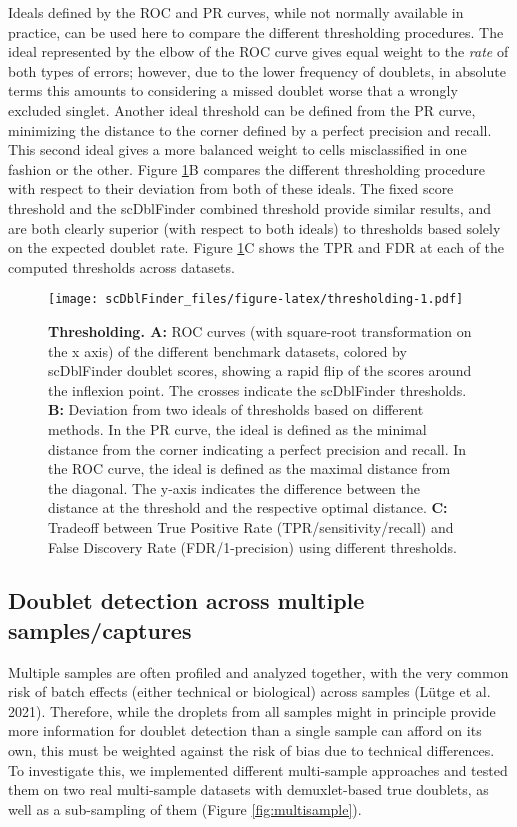 \documentclass[10pt,a4paper,twocolumn]{article}
\begin{document}
Ideals defined by the ROC and PR curves, while not normally available in practice, can be used here to compare the different thresholding procedures.
The ideal represented by the elbow of the ROC curve gives equal weight to the \emph{rate} of both types of errors; however, due to the lower frequency of doublets, in absolute terms this amounts to considering a missed doublet worse that a wrongly excluded singlet.
Another ideal threshold can be defined from the PR curve, minimizing the distance to the corner defined by a perfect precision and recall.
This second ideal gives a more balanced weight to cells misclassified in one fashion or the other.
Figure \ref{fig:thresholding}B compares the different thresholding procedure with respect to their deviation from both of these ideals.
The fixed score threshold and the scDblFinder combined threshold provide similar results, and are both clearly superior (with respect to both ideals) to thresholds based solely on the expected doublet rate.
Figure \ref{fig:thresholding}C shows the TPR and FDR at each of the computed thresholds across datasets.

\begin{figure}
\centering
\texttt{[image: scDblFinder\_files/figure-latex/thresholding-1.pdf]}
\caption{\label{fig:thresholding}\textbf{Thresholding. A:} ROC curves (with square-root transformation on the x axis) of the different benchmark datasets, colored by scDblFinder doublet scores, showing a rapid flip of the scores around the inflexion point. The crosses indicate the scDblFinder thresholds. \textbf{B:} Deviation from two ideals of thresholds based on different methods. In the PR curve, the ideal is defined as the minimal distance from the corner indicating a perfect precision and recall. In the ROC curve, the ideal is defined as the maximal distance from the diagonal. The y-axis indicates the difference between the distance at the threshold and the respective optimal distance. \textbf{C:} Tradeoff between True Positive Rate (TPR/sensitivity/recall) and False Discovery Rate (FDR/1-precision) using different thresholds.}
\end{figure}

\subsection{Doublet detection across multiple samples/captures}

Multiple samples are often profiled and analyzed together, with the very common risk of batch effects (either technical or biological) across samples (Lütge et al. 2021).
Therefore, while the droplets from all samples might in principle provide more information for doublet detection than a single sample can afford on its own, this must be weighted against the risk of bias due to technical differences.
To investigate this, we implemented different multi-sample approaches and tested them on two real multi-sample datasets with demuxlet-based true doublets, as well as a sub-sampling of them (Figure \ref{fig:multisample}).
\end{document}
